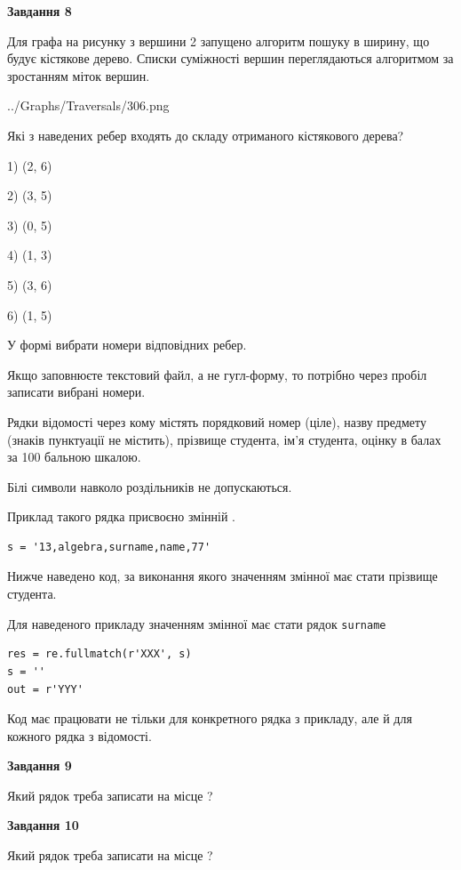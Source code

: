 \documentclass[12pt, ukrainian]{article}
\def\code#1{\Verb!#1!}
\begin{document}
{\begin {large}
{\begin {center}\textbf{Завдання 8}\end {center}}\par
Для графа на рисунку з вершини 2 запущено алгоритм пошуку в ширину, що будує кістякове дерево. Списки суміжності вершин переглядаються алгоритмом за зростанням міток вершин.\par
\begin{center}
	{../Graphs/Traversals/306.png}
\end{center}
\par Які з наведених ребер входять до складу отриманого кістякового дерева?\par
1) (2, 6)\par
2) (3, 5)\par
3) (0, 5)\par
4) (1, 3)\par
5) (3, 6)\par
6) (1, 5)\par
{\vskip 15pt} У формі вибрати номери відповідних ребер.


Якщо заповнюєте текстовий файл, а не гугл-форму, то потрібно через пробіл записа\-ти вибрані номери.\par
\newpage


Рядки відомості через кому містять порядковий номер (ціле), назву предмету (зна\-ків пунктуації не містить), прізвище студента, ім'я студента, оцінку в балах за 100 бальною шкалою.

Білі символи навколо роздільників не допускаються.

Приклад такого рядка присвоєно змінній .



\begin{verbatim}
s = '13,algebra,surname,name,77'
\end{verbatim}


Нижче наведено код, за виконання якого значенням змінної  має стати прізвище студента.

Для наведеного прикладу значенням змінної  має стати рядок \code{surname}



\begin{verbatim}
res = re.fullmatch(r'XXX', s)
s = ''
out = r'YYY'
\end{verbatim}


Код має працювати не тільки для конкретного рядка з прикладу, але й для кожного рядка з відомості.

{\begin {center}\textbf{Завдання 9}\end {center}}\par
Який рядок треба записати на місце  ?\par
\vspace{5mm}


{\begin {center}\textbf{Завдання 10}\end {center}}\par
Який рядок треба записати на місце  ?\par


\newpage


\end {large}}
\end{document}
